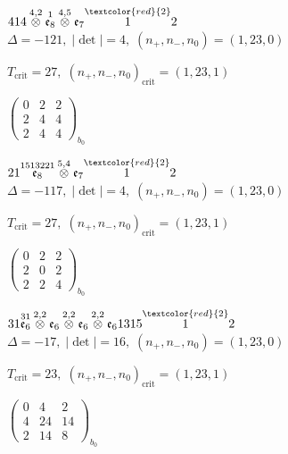 \documentclass[10pt]{article}
\begin{document}
\smallskip

$414\overset{4,2}{\otimes}\overset{1}{\mathfrak{e}_8}\overset{4,5}{\otimes}\mathfrak{e}_7\overset{\textcolor{red}{2}}{1}2$ \quad $\Delta=-121,\; |\det|=4,\; (n_+,n_-,n_0)=(1,23,0)$

\hspace{1em}$T_{\text{crit}}=27,\; (n_+,n_-,n_0)_{\text{crit}}=(1,23,1)$

\hspace{2em}$\left(\begin{smallmatrix}0 & 2 & 2 \\ 2 & 4 & 4 \\ 2 & 4 & 4\end{smallmatrix}\right)_{\!b_0}$

\smallskip

$21\overset{1513221}{\mathfrak{e}_8}\overset{5,4}{\otimes}\mathfrak{e}_7\overset{\textcolor{red}{2}}{1}2$ \quad $\Delta=-117,\; |\det|=4,\; (n_+,n_-,n_0)=(1,23,0)$

\hspace{1em}$T_{\text{crit}}=27,\; (n_+,n_-,n_0)_{\text{crit}}=(1,23,1)$

\hspace{2em}$\left(\begin{smallmatrix}0 & 2 & 2 \\ 2 & 0 & 2 \\ 2 & 2 & 4\end{smallmatrix}\right)_{\!b_0}$

\smallskip

$31\overset{31}{\mathfrak{e}_6}\overset{2,2}{\otimes}\mathfrak{e}_6\overset{2,2}{\otimes}\mathfrak{e}_6\overset{2,2}{\otimes}\mathfrak{e}_61315\overset{\textcolor{red}{2}}{1}2$ \quad $\Delta=-17,\; |\det|=16,\; (n_+,n_-,n_0)=(1,23,0)$

\hspace{1em}$T_{\text{crit}}=23,\; (n_+,n_-,n_0)_{\text{crit}}=(1,23,1)$

\hspace{2em}$\left(\begin{smallmatrix}0 & 4 & 2 \\ 4 & 24 & 14 \\ 2 & 14 & 8\end{smallmatrix}\right)_{\!b_0}$
\end{document}
